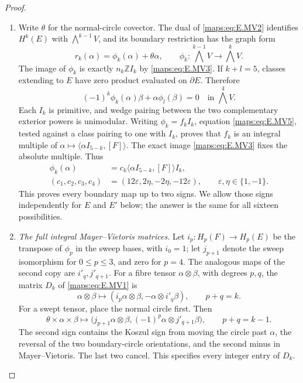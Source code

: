 \begin{proof}
\begin{enumerate}[label=\arabic*.,leftmargin=*]
\item Write $\theta$ for the normal-circle covector. The dual of
\eqref{maps:eq:E.MV2} identifies $H^k(E)$ with $\bigwedge^{k-1}V$, and
its boundary restriction has the graph form
\[
 r_k(\alpha)=\phi_k(\alpha)+\theta\alpha,
 \qquad
 \phi_k:\bigwedge^{k-1}V\longrightarrow\bigwedge^kV.
 \tag{E.MV4}\label{maps:eq:E.MV4}
\]
The image of $\phi_k$ is exactly $n_k\mathbb Z I_k$ by
\eqref{maps:eq:E.MV3}. If $k+l=5$, classes extending to $E$ have zero
product evaluated on $\partial E$. Therefore
\[
 (-1)^k\phi_k(\alpha)\beta+
                    \alpha\phi_l(\beta)=0
 \quad\text{in }\bigwedge^4V.
 \tag{E.MV5}\label{maps:eq:E.MV5}
\]
Each $I_k$ is primitive, and wedge pairing between the two
complementary exterior powers is unimodular. Writing
$\phi_k=f_k I_k$, equation \eqref{maps:eq:E.MV5}, tested against a class
pairing to one with $I_k$, proves that $f_k$ is an integral
multiple of $\alpha\mapsto\langle\alpha I_{5-k},[F]\rangle$.
The exact image \eqref{maps:eq:E.MV3} fixes the absolute multiple. Thus
\[
 \begin{split}
 \phi_k(\alpha)&=c_k
       \langle\alpha I_{5-k},[F]\rangle I_k,\\
 (c_1,c_2,c_3,c_4)&=(12\varepsilon,2\eta,-2\eta,-12\varepsilon),
 \qquad \varepsilon,\eta\in\{1,-1\}.
 \end{split}
 \tag{E.MV6}\label{maps:eq:E.MV6}
\]
This proves every boundary map up to two signs. We allow those
signs independently for $E$ and $E'$ below; the answer is the
same for all sixteen possibilities.

\item \emph{The full integral Mayer--Vietoris matrices.}
Let $i_p:H_p(F)\to H_p(E)$ be the transpose of $\phi_p$ in
the sweep bases, with $i_0=1$; let $j_{p+1}$ denote the sweep
isomorphism for $0\leq p\leq3$, and zero for $p=4$.
The analogous maps of the second copy are $i'_q,j'_{q+1}$.
For a fibre tensor $\alpha\otimes\beta$, with degrees $p,q$,
the matrix $D_k$ of \eqref{maps:eq:E.MV1} is
\[
 \alpha\otimes\beta\longmapsto
  (i_p\alpha\otimes\beta,-\alpha\otimes i'_q\beta),
 \qquad p+q=k.
 \tag{E.MV7}\label{maps:eq:E.MV7}
\]
For a swept tensor, place the normal circle first. Then
\[
 \theta\times\alpha\times\beta\longmapsto
 \bigl(j_{p+1}\alpha\otimes\beta,
                 (-1)^p\alpha\otimes j'_{q+1}\beta\bigr),
 \qquad p+q=k-1.
 \tag{E.MV8}\label{maps:eq:E.MV8}
\]
The second sign contains the Koszul sign from moving the circle
past $\alpha$, the reversal of the two boundary-circle
orientations, and the second minus in Mayer--Vietoris. The last
two cancel. This specifies every integer entry of $D_k$.


\end{enumerate}
\end{proof}
